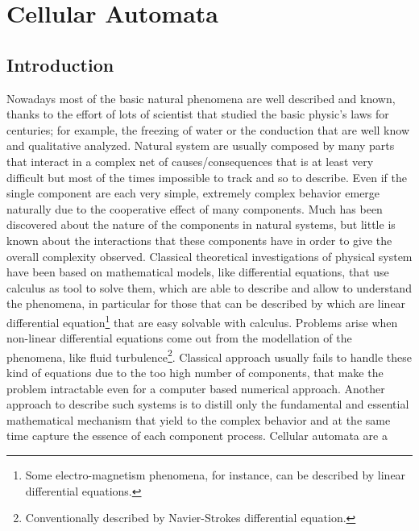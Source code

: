 

\chapter{Cellular Automata}

\section{Introduction}\label{cellularAutomataIntroduction}
Nowadays most of the basic natural phenomena are well described and known,
thanks to the effort of lots of scientist that studied the basic physic's laws for
centuries; for example, the freezing of water or the conduction that are well
know and qualitative analyzed. Natural system are usually composed by
many parts that interact in a complex net of causes/consequences that is at
least very difficult but most of the times impossible to track and so to
describe. Even if the single component are each very simple,
extremely complex behavior emerge naturally due to the cooperative effect of
many components. Much has been discovered about the nature of the components in
natural systems, but little is known about the interactions that these
components have in order to give the overall complexity observed.
Classical theoretical investigations of physical system have been based on
mathematical models, like differential equations, that use calculus as tool
to solve them, which are able to describe and allow to understand the
phenomena, in particular for those that can be described by which are linear
differential equation\footnote{Some electro-magnetism phenomena, for instance,
can be described by linear differential equations.} that are easy solvable with calculus.
Problems arise when non-linear differential equations come out from the
modellation of the phenomena, like fluid turbulence\footnote{Conventionally
described by Navier-Strokes differential equation.}.
Classical approach usually fails to handle these kind of equations due to the
too high number of components, that make the problem intractable even for a computer based numerical approach.
Another approach to describe such systems is to distill only the fundamental and
essential mathematical mechanism that yield to the complex behavior and at  the
same time capture the essence of each component process. Cellular automata are a

